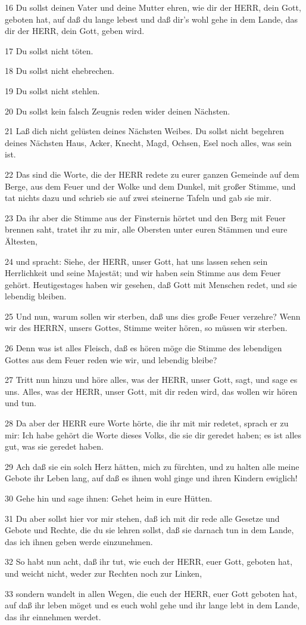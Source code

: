 \par 16 Du sollst deinen Vater und deine Mutter ehren, wie dir der HERR, dein Gott, geboten hat, auf daß du lange lebest und daß dir's wohl gehe in dem Lande, das dir der HERR, dein Gott, geben wird.
\par 17 Du sollst nicht töten.
\par 18 Du sollst nicht ehebrechen.
\par 19 Du sollst nicht stehlen.
\par 20 Du sollst kein falsch Zeugnis reden wider deinen Nächsten.
\par 21 Laß dich nicht gelüsten deines Nächsten Weibes. Du sollst nicht begehren deines Nächsten Haus, Acker, Knecht, Magd, Ochsen, Esel noch alles, was sein ist.
\par 22 Das sind die Worte, die der HERR redete zu eurer ganzen Gemeinde auf dem Berge, aus dem Feuer und der Wolke und dem Dunkel, mit großer Stimme, und tat nichts dazu und schrieb sie auf zwei steinerne Tafeln und gab sie mir.
\par 23 Da ihr aber die Stimme aus der Finsternis hörtet und den Berg mit Feuer brennen saht, tratet ihr zu mir, alle Obersten unter euren Stämmen und eure Ältesten,
\par 24 und spracht: Siehe, der HERR, unser Gott, hat uns lassen sehen sein Herrlichkeit und seine Majestät; und wir haben sein Stimme aus dem Feuer gehört. Heutigestages haben wir gesehen, daß Gott mit Menschen redet, und sie lebendig bleiben.
\par 25 Und nun, warum sollen wir sterben, daß uns dies große Feuer verzehre? Wenn wir des HERRN, unsers Gottes, Stimme weiter hören, so müssen wir sterben.
\par 26 Denn was ist alles Fleisch, daß es hören möge die Stimme des lebendigen Gottes aus dem Feuer reden wie wir, und lebendig bleibe?
\par 27 Tritt nun hinzu und höre alles, was der HERR, unser Gott, sagt, und sage es uns. Alles, was der HERR, unser Gott, mit dir reden wird, das wollen wir hören und tun.
\par 28 Da aber der HERR eure Worte hörte, die ihr mit mir redetet, sprach er zu mir: Ich habe gehört die Worte dieses Volks, die sie dir geredet haben; es ist alles gut, was sie geredet haben.
\par 29 Ach daß sie ein solch Herz hätten, mich zu fürchten, und zu halten alle meine Gebote ihr Leben lang, auf daß es ihnen wohl ginge und ihren Kindern ewiglich!
\par 30 Gehe hin und sage ihnen: Gehet heim in eure Hütten.
\par 31 Du aber sollst hier vor mir stehen, daß ich mit dir rede alle Gesetze und Gebote und Rechte, die du sie lehren sollst, daß sie darnach tun in dem Lande, das ich ihnen geben werde einzunehmen.
\par 32 So habt nun acht, daß ihr tut, wie euch der HERR, euer Gott, geboten hat, und weicht nicht, weder zur Rechten noch zur Linken,
\par 33 sondern wandelt in allen Wegen, die euch der HERR, euer Gott geboten hat, auf daß ihr leben möget und es euch wohl gehe und ihr lange lebt in dem Lande, das ihr einnehmen werdet.

